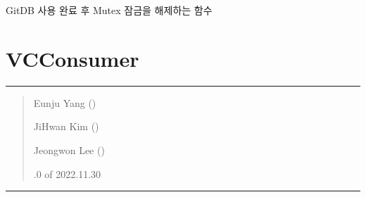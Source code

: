 \documentclass[a4paper,10pt,english]{sphinxmanual}
\begin{document}
\begin{fulllineitems}
\begin{fulllineitems}
\end{fulllineitems}


\begin{fulllineitems}
\label{\detokenize{_VCModule:vcModule.unlockMutex}}
\pysigstartsignatures
{}
\pysigstopsignatures
\sphinxAtStartPar
GitDB 사용 완료 후 Mutex 잠금을 해제하는 함수

\end{fulllineitems}


\end{fulllineitems}


\sphinxstepscope


\section{VCConsumer}
\label{\detokenize{_VCConsumer:vcconsumer}}\label{\detokenize{_VCConsumer:id1}}\label{\detokenize{_VCConsumer::doc}}

\bigskip\hrule\bigskip

\begin{quote}\begin{description}
\begin{DUlineblock}{0em}
\item[] Eunju Yang ()
\item[] JiHwan Kim ()
\item[] Jeongwon Lee ()
\end{DUlineblock}

.0 of 2022.11.30

\end{description}\end{quote}


\bigskip\hrule\bigskip

\end{document}
